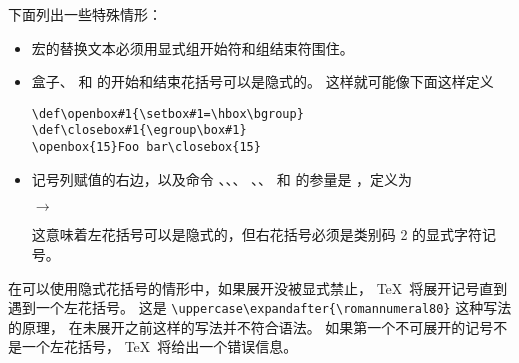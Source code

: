 \documentclass[letterpaper]{book}
\begin{document}
下面列出一些特殊情形：
\begin{itemize}
\item 宏的替换文本必须用显式组开始符和组结束符围住。
\item 盒子、 和  的开始和结束花括号可以是隐式的。
这样就可能像下面这样定义
\begin{verbatim}
\def\openbox#1{\setbox#1=\hbox\bgroup}
\def\closebox#1{\egroup\box#1}
\openbox{15}Foo bar\closebox{15}
\end{verbatim}
\item 记号列赋值的右边，以及命令 、、、 
、、 和  的参量是
，定义为
\begin{Disp}  $\longrightarrow$ \lb
      \end{Disp}
这意味着左花括号可以是隐式的，但右花括号必须是类别码 2 
的显式字符记号。
\end{itemize}

在可以使用隐式花括号的情形中，如果展开没被显式禁止，
\TeX\ 将展开记号直到遇到一个左花括号。
这是 \verb=\uppercase\expandafter{\romannumeral80}= 这种写法的原理，
在未展开之前这样的写法并不符合语法。
如果第一个不可展开的记号不是一个左花括号，
\TeX\ 将给出一个错误信息。
\end{document}

